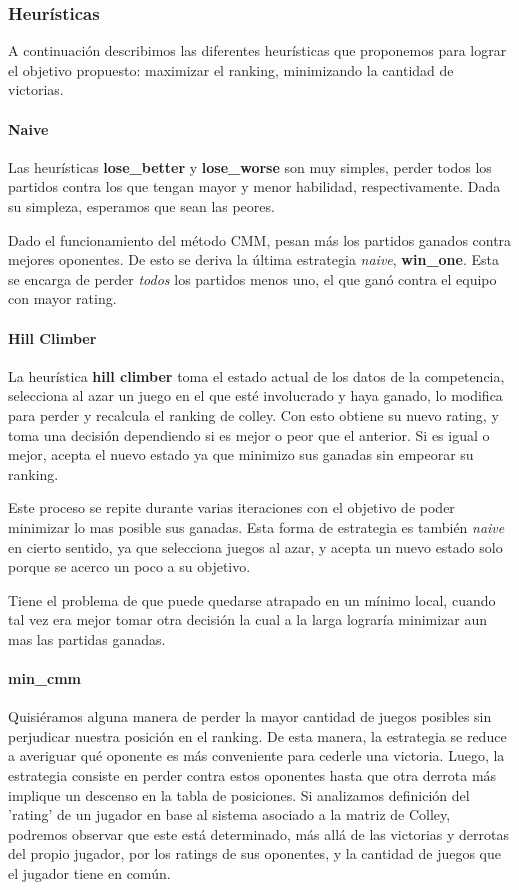 \documentclass[a4paper]{article}
\begin{document}
\subsubsection{Heurísticas}
A continuación describimos las diferentes heurísticas que proponemos para lograr el objetivo propuesto: maximizar el ranking, minimizando la cantidad de victorias.

\paragraph{Naive}
Las heurísticas \textbf{lose\_better} y \textbf{lose\_worse} son muy simples, perder todos los partidos contra los que tengan mayor y menor habilidad, respectivamente. Dada su simpleza, esperamos que sean las peores.

Dado el funcionamiento del método CMM, pesan más los partidos ganados contra mejores oponentes. De esto se deriva la última estrategia \textit{naive}, \textbf{win\_one}. Esta se encarga de perder \textit{todos} los partidos menos uno, el que ganó contra el equipo con mayor rating.

\paragraph{Hill Climber}
La heurística \textbf{hill climber} toma el estado actual de los datos de la competencia, selecciona al azar un juego en el que esté involucrado y haya ganado, lo modifica para perder y recalcula el ranking de colley. Con esto obtiene su nuevo rating, y toma una decisión dependiendo si es mejor o peor que el anterior. Si es igual o mejor, acepta el nuevo estado ya que minimizo sus ganadas sin empeorar su ranking.

Este proceso se repite durante varias iteraciones con el objetivo de poder minimizar lo mas posible sus ganadas. Esta forma de estrategia es también \textit{naive} en cierto sentido, ya que selecciona juegos al azar, y acepta un nuevo estado solo porque se acerco un poco a su objetivo. 

Tiene el problema de que puede quedarse atrapado en un mínimo local, cuando tal vez era mejor tomar otra decisión la cual a la larga lograría minimizar aun mas las partidas ganadas.

\paragraph{min\_cmm}

Quisiéramos alguna manera de perder la mayor cantidad de juegos posibles sin perjudicar nuestra posición en el ranking. De esta manera, la estrategia se reduce a averiguar qué oponente es más conveniente para cederle una victoria. Luego, la estrategia consiste en perder contra estos oponentes hasta que otra derrota más implique un descenso en la tabla de posiciones. Si analizamos definición del 'rating' de un jugador en base al sistema asociado a la matriz de Colley, podremos observar que este está determinado, más allá de las victorias y derrotas del propio jugador, por los ratings de sus oponentes, y la cantidad de juegos que el jugador tiene en común.
\end{document}
